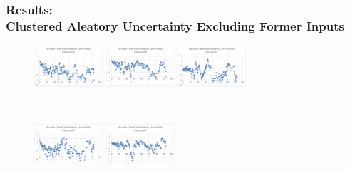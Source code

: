 \documentclass{beamer}
\begin{document}
\begin{frame}
\frametitle{Results:\\Clustered Aleatory Uncertainty Excluding Former Inputs}
\begin{figure} 
  \centering 
  \begin{minipage}[b]{0.2\textwidth} 
    \centering 
    \includegraphics[width=1in]{clustered3.png} 
  \end{minipage}%
  \hspace{0.04\linewidth}%
  \begin{minipage}[b]{0.2\textwidth} 
    \centering 
    \includegraphics[width=1in]{clustered4.png} 
  \end{minipage}
  \hspace{0.04\linewidth}%
  \begin{minipage}[b]{0.2\textwidth} 
    \centering 
    \includegraphics[width=1in]{clustered5.png} 
  \end{minipage} \\[20pt] 
  \begin{minipage}[b]{0.2\textwidth} 
    \centering 
    \includegraphics[width=1in]{clustered6.png}  
  \end{minipage}%
  \hspace{0.04\linewidth}%
  \begin{minipage}[b]{0.2\textwidth} 
    \centering 
    \includegraphics[width=1in]{clustered7.png} 
  \end{minipage}%
  \hspace{0.04\linewidth}%

\end{figure}
\end{frame}
\end{document}
